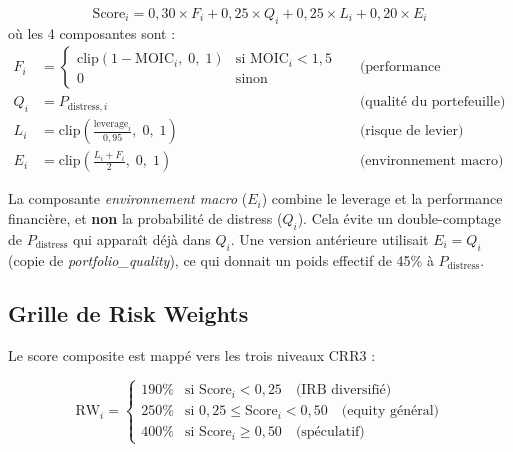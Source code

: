 \documentclass[12pt,a4paper]{article}
\begin{document}
\begin{formulebox}
\begin{equation}
\label{eq:crr3_score}
\mathrm{Score}_i = 0{,}30 \times F_i + 0{,}25 \times Q_i + 0{,}25 \times L_i + 0{,}20 \times E_i
\end{equation}
o\`{u} les 4 composantes sont :
\begin{align}
F_i &= \begin{cases} \mathrm{clip}(1 - \mathrm{MOIC}_i,\; 0,\; 1) & \text{si } \mathrm{MOIC}_i < 1{,}5 \\ 0 & \text{sinon} \end{cases}
&& \text{(performance financi\`{e}re)} \label{eq:financial_perf}\\[4pt]
Q_i &= P_{\mathrm{distress},i}
&& \text{(qualit\'{e} du portefeuille)} \label{eq:portfolio_quality}\\[4pt]
L_i &= \mathrm{clip}\!\left(\frac{\text{leverage}_i}{0{,}95},\; 0,\; 1\right)
&& \text{(risque de levier)} \label{eq:leverage_risk}\\[4pt]
E_i &= \mathrm{clip}\!\left(\frac{L_i + F_i}{2},\; 0,\; 1\right)
&& \text{(environnement macro)} \label{eq:macro_env}
\end{align}
\end{formulebox}

\begin{warningbox}
La composante \textit{environnement macro} ($E_i$) combine le leverage et la performance
financi\`{e}re, et \textbf{non} la probabilit\'{e} de distress ($Q_i$). Cela \'{e}vite un
double-comptage de $P_{\mathrm{distress}}$ qui appara\^{i}t d\'{e}j\`{a} dans $Q_i$.
Une version ant\'{e}rieure utilisait $E_i = Q_i$ (copie de \textit{portfolio\_quality}),
ce qui donnait un poids effectif de 45\% \`{a} $P_{\mathrm{distress}}$.
\end{warningbox}

\subsection{Grille de Risk Weights}

Le score composite est mapp\'{e} vers les trois niveaux CRR3 :

\begin{formulebox}
\begin{equation}
\label{eq:rw_mapping}
\mathrm{RW}_i = \begin{cases}
190\% & \text{si } \mathrm{Score}_i < 0{,}25 \quad \text{(IRB diversifi\'{e})} \\
250\% & \text{si } 0{,}25 \leq \mathrm{Score}_i < 0{,}50 \quad \text{(equity g\'{e}n\'{e}ral)} \\
400\% & \text{si } \mathrm{Score}_i \geq 0{,}50 \quad \text{(sp\'{e}culatif)}
\end{cases}
\end{equation}
\end{formulebox}
\end{document}
